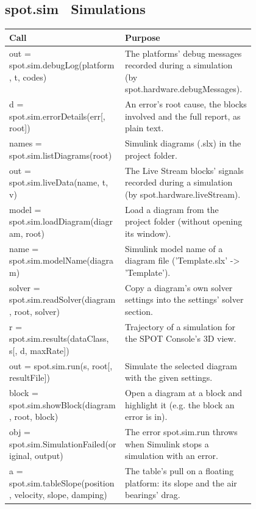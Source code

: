 \documentclass[11pt,a4paper]{article}
\begin{document}
\subsection*{spot.sim \textmd{\textendash\ Simulations}}
\begin{xltabular}{\linewidth}{@{}>{\raggedright\arraybackslash\ttfamily\footnotesize}p{0.47\linewidth} >{\raggedright\arraybackslash\small}X@{}}
\toprule \normalfont\small\textbf{Call} & \textbf{Purpose} \\ \midrule \endhead
out = spot.sim.debugLog(platform, t, codes) & The platforms' debug messages recorded during a simulation (by spot.hardware.debugMessages). \\
d = spot.sim.errorDetails(err[, root]) & An error's root cause, the blocks involved and the full report, as plain text. \\
names = spot.sim.listDiagrams(root) & Simulink diagrams (.slx) in the project folder. \\
out = spot.sim.liveData(name, t, v) & The Live Stream blocks' signals recorded during a simulation (by spot.hardware.liveStream). \\
model = spot.sim.loadDiagram(diagram, root) & Load a diagram from the project folder (without opening its window). \\
name = spot.sim.modelName(diagram) & Simulink model name of a diagram file ('Template.slx' -> 'Template'). \\
solver = spot.sim.readSolver(diagram, root, solver) & Copy a diagram's own solver settings into the settings' solver section. \\
r = spot.sim.results(dataClass, s[, d, maxRate]) & Trajectory of a simulation for the SPOT Console's 3D view. \\
out = spot.sim.run(s, root[, resultFile]) & Simulate the selected diagram with the given settings. \\
block = spot.sim.showBlock(diagram, root, block) & Open a diagram at a block and highlight it (e.g. the block an error is in). \\
obj = spot.sim.SimulationFailed(original, output) & The error spot.sim.run throws when Simulink stops a simulation with an error. \\
a = spot.sim.tableSlope(position, velocity, slope, damping) & The table's pull on a floating platform: its slope and the air bearings' drag. \\
\bottomrule\end{xltabular}
\end{document}
